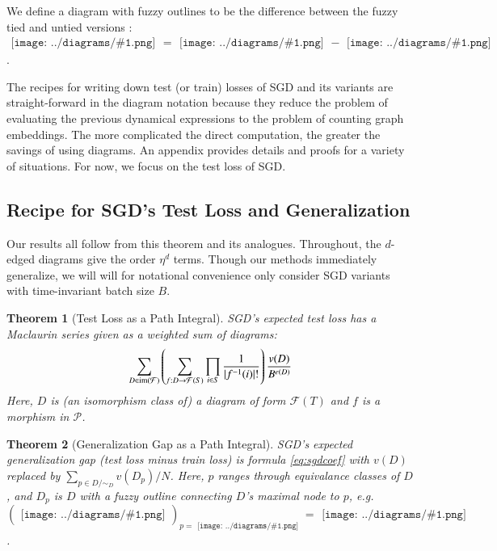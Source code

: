 \documentclass{article}
\newtheorem{thm}{Theorem}
\newcommand{\Free}{\mathcal{F}}
\newcommand{\image}{\text{\textnormal{im}}}
\newcommand{\Pp}{\mathcal{P}}
\newcommand{\sdia}[1]{\begin{gathered}\texttt{[image: ../diagrams/\#1.png]}\end{gathered}}
\begin{document}
        We define a diagram with fuzzy outlines to be the difference between
        the fuzzy tied and untied versions : $\sdia{c(01-2)(01-12)} =
        \sdia{(01-2)(01-12)}-\sdia{(0-1-2)(01-12)}$. 
        
        The recipes for writing down test (or train) losses of SGD and its
        variants are straight-forward in the diagram notation because they
        reduce the problem of evaluating the previous dynamical expressions to
        the problem of counting graph embeddings.  The more complicated the
        direct computation, the greater the savings of using diagrams.  An
        appendix provides details and proofs for a variety of situations.  For
        now, we focus on the test loss of SGD.
    

    \subsection{Recipe for SGD's Test Loss and Generalization}

        Our results all follow from this theorem and its analogues.
        Throughout, the $d$-edged diagrams give the order $\eta^d$ terms.
        Though our methods immediately generalize, we will will for notational
        convenience only consider SGD variants with time-invariant batch size
        $B$. 
        \begin{thm}[Test Loss as a Path Integral] \label{thm:test}
            SGD's expected test loss has a Maclaurin series
            given as a weighted sum of diagrams:
            \begin{equation}\label{eq:sgdcoef}
                \sum_{D \in \image(\Free)}
                \left(
                    \sum_{f: D\to\Free(S)}
                    \prod_{i\in S} \frac{1}{|f^{-1}(i)|!}
                \right)
                \frac{v(D)}{B^{e(D)}}
            \end{equation}
            Here, $D$ is (an isomorphism class of) a diagram of form
            $\Free(T)$ and $f$ is a morphism in $\Pp$.
        \end{thm}
        \begin{thm}[Generalization Gap as a Path Integral] \label{thm:gen}
            SGD's expected generalization gap (test loss minus train loss) is
            formula \ref{eq:sgdcoef} with $v(D)$ replaced by
            $
                \sum_{p \in D/\sim_D} v(D_p)/N
            $.
            Here, $p$ ranges through equivalance classes of $D$, and $D_p$ is $D$
            with a fuzzy outline connecting $D$'s maximal node to $p$,
            e.g. $(\sdia{(0-1)(01)})_{p=\sdia{(0)()}} = \sdia{c(01)(01)}$.
        \end{thm}
    
\end{document}
